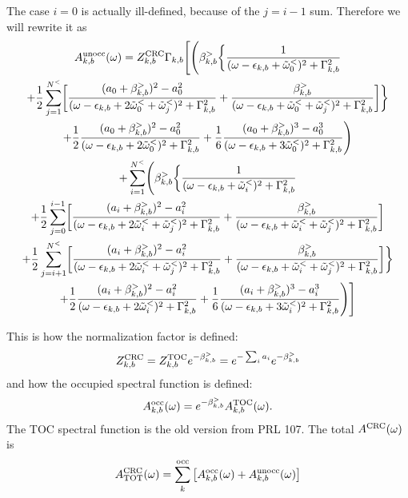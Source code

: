 \documentclass[a4paper,12pt]{article}
\begin{document}
The case $i=0$ is actually ill-defined, because of the $j= i-1$ sum. Therefore we will rewrite it as
\begin{multline}
 A_{k,b}^\textnormal{unocc}(\omega) = Z_{k,b}^\textnormal{CRC} \Gamma_{k,b} \Biggl[ 
   \Biggl( \beta_{k,b}^> \biggl\{
 \frac1{(\omega - \epsilon_{k,b} + \tilde\omega_0^<)^2 + \Gamma_{k,b}^2}  \\ 
  + \frac12 \sum_{j=1}^{N^<} \biggl[ \frac{(a_0 + \beta_{k,b}^>)^2 - a_0^2 }
  {(\omega - \epsilon_{k,b} + 2 \tilde\omega_0^< + \tilde\omega_j^<)^2 + \Gamma_{k,b}^2} 
 + \frac{\beta_{k,b}^>}{(\omega - \epsilon_{k,b} + \tilde\omega_0^< + \tilde\omega_j^<)^2 + \Gamma_{k,b}^2}
 \biggr] \biggr\} \\
 + \frac12 \frac{(a_0 + \beta_{k,b}^>)^2 - a_0^2}{(\omega - \epsilon_{k,b} + 2 \tilde\omega_0^<)^2 + \Gamma_{k,b}^2} 
 + \frac16 \frac{(a_0 + \beta_{k,b}^>)^3 - a_0^3}{(\omega - \epsilon_{k,b} + 3 \tilde\omega_0^<)^2 + \Gamma_{k,b}^2} 
 \Biggr) \\
 + \sum_{i=1}^{N^<} \Biggl( \beta_{k,b}^> \biggl\{
 \frac1{(\omega - \epsilon_{k,b} + \tilde\omega_i^<)^2 + \Gamma_{k,b}^2}  \\ 
  + \frac12 \sum_{j=0}^{i-1} \biggl[ \frac{(a_i + \beta_{k,b}^>)^2 - a_i^2 }
  {(\omega - \epsilon_{k,b} + 2 \tilde\omega_i^< + \tilde\omega_j^<)^2 + \Gamma_{k,b}^2} 
 + \frac{\beta_{k,b}^>}{(\omega - \epsilon_{k,b} + \tilde\omega_i^< + \tilde\omega_j^<)^2 + \Gamma_{k,b}^2}  \biggr] \\ 
  + \frac12 \sum_{j=i+1}^{N^<} \biggl[ \frac{(a_i + \beta_{k,b}^>)^2 - a_i^2 }
  {(\omega - \epsilon_{k,b} + 2 \tilde\omega_i^< + \tilde\omega_j^<)^2 + \Gamma_{k,b}^2} 
 + \frac{\beta_{k,b}^>}{(\omega - \epsilon_{k,b} + \tilde\omega_i^< + \tilde\omega_j^<)^2 + \Gamma_{k,b}^2}
 \biggr] \biggr\} \\
 + \frac12 \frac{(a_i + \beta_{k,b}^>)^2 - a_i^2}{(\omega - \epsilon_{k,b} + 2 \tilde\omega_i^<)^2 + \Gamma_{k,b}^2} 
 + \frac16 \frac{(a_i + \beta_{k,b}^>)^3 - a_i^3}{(\omega - \epsilon_{k,b} + 3 \tilde\omega_i^<)^2 + \Gamma_{k,b}^2} 
 \Biggr) \Biggr]
\end{multline}


This is how the normalization factor is defined: 
\begin{equation}
  Z_{k,b}^\textnormal{CRC} = Z_{k,b}^\textnormal{TOC} e^{ - \beta_{k,b}^> } =  e^{ - \sum_i a_i }  e^{ - \beta_{k,b}^> } 
\end{equation}
and how the occupied spectral function is defined:
\begin{equation}
  A_{k,b}^\textnormal{occ}(\omega) = e^{ - \beta_{k,b}^> } A_{k,b}^\textnormal{TOC}(\omega) .
\end{equation}
The TOC spectral function is the old version from PRL 107. 
The total $A^\textnormal{CRC}(\omega)$ is 
\begin{equation}
   A_\textnormal{TOT}^\textnormal{CRC}(\omega) = \sum_k^\textnormal{occ} \left[ A_{k,b}^\textnormal{occ}(\omega) + A_{k,b}^\textnormal{unocc}(\omega) \right]
\end{equation}
\end{document}
